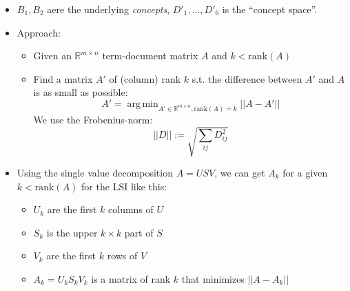 \documentclass[a4paper]{scrartcl}
\DeclareMathOperator*{\argmin}{arg\,min}
\newcommand{\blu}[1]{\textcolor{mainblue}{#1}}
\begin{document}
\begin{itemize}
\begin{equation}
\begin{array}{cccccc}
        1&1&1&1&0&0 \\
        1&1&1&2&1&1 \\
        0&0&0&1&1&1
      \end{array}
    \right) = 
\underbrace{\left(
      \begin{array}{cc}
        1&0\\
        1&0\\
        1&1\\
        0&1\\
      \end{array}
    \right)}_{\mathrm{``concepts''}}\cdot
\underbrace{\left(
      \begin{array}{cccccc}
        1&1&1&1&0&0 \\
        0&0&0&1&1&1 
      \end{array}
    \right)}_{\mathrm{``concept\ space''}}
  \end{equation}
\item $B_1, B_2$ aere the underlying \blu{\emph{concepts}}, $D'_1,...,D'_6$ is
  the ``concept space''.
\item Approach:
  \begin{itemize}
  \item Given an $\mathbb{R}^{m\times n}$ term-document matrix $A$ and $k < \mathrm{rank}(A)$
  \item Find a matrix $A'$ of (column) rank $k$ s.t. the difference between $A'$
    and $A$ is as small as possible:
    \[A'=\argmin_{A'\in \mathbb{R}^{m\times n}, \mathrm{rank}(A)=k}||A-A'||\]
    We use the Frobenius-norm:
    \[||D||:=\sqrt{\sum_{ij}D_{ij}^2}\]
  \end{itemize}
\item Using the single value decomposition $A=USV$, we can get $A_k$ for a given
  $k<\mathrm{rank}(A)$ for the LSI like this:
  \begin{itemize}
  \item $U_k$ are the first $k$ columns of $U$
  \item $S_k$ is the upper $k\times k$ part of $S$
  \item $V_k$ are the first $k$ rows of $V$
  \item[$\Rightarrow$] $A_k=U_kS_kV_k$ is a matrix of rank $k$ that minimizes $||A-A_k||$
  \end{itemize}
\end{itemize}
\end{document}
